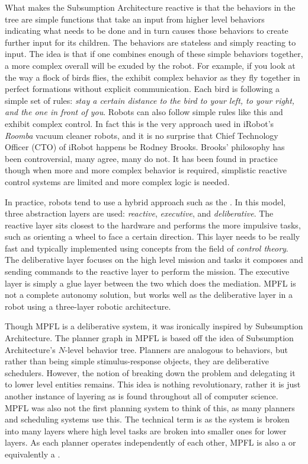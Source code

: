 What makes the Subsumption Architecture reactive is that the behaviors in the tree are simple functions that take an input from higher level behaviors indicating what needs to be done and in turn causes those behaviors to create further input for its children. The behaviors are stateless and simply reacting to input. The idea is that if one combines enough of these simple behaviors together, a more complex overall  will be exuded by the robot. For example, if you look at the way a flock of birds flies, the exhibit complex behavior as they fly together in perfect formations without explicit communication. Each bird is following a simple set of rules: \textit{stay a certain distance to the bird to your left, to your right, and the one in front of you}. Robots can also follow simple rules like this and exhibit complex control. In fact this is the very approach used in iRobot's \textit{Roomba} vacuum cleaner robots, and it is no surprise that Chief Technology Officer (CTO) of iRobot happens be Rodney Brooks. Brooks' philosophy has been controversial, many agree, many do not. It has been found in practice though when more and more complex behavior is required, simplistic reactive control systems are limited and more complex logic is needed.

In practice, robots tend to use a hybrid approach such as the . In this model, three abstraction layers are used: \textit{reactive}, \textit{executive}, and \textit{deliberative}. The reactive layer sits closest to the hardware and performs the more impulsive tasks, such as orienting a wheel to face a certain direction. This layer needs to be really fast and typically implemented using concepts from the field of \textit{control theory}. The deliberative layer focuses on the high level mission and tasks it composes and sending commands to the reactive layer to perform the mission. The executive layer is simply a glue layer between the two which does the mediation. MPFL is not a complete autonomy solution, but works well as the deliberative layer in a robot using a three-layer robotic architecture.

Though MPFL is a deliberative system, it was ironically inspired by Subsumption Architecture. The planner graph in MPFL is based off the idea of Subsumption Architecture's $N$-level behavior tree. Planners are analogous to behaviors, but rather than being simple stimulus-response objects, they are deliberative schedulers. However, the notion of breaking down the problem and delegating it to lower level entities remains. This idea is nothing revolutionary, rather it is just another instance of layering as is found throughout all of computer science. MPFL was also not the first planning system to think of this, as many planners and scheduling systems use this. The technical term is  as the system is broken into many layers where high level tasks are broken into smaller ones for lower layers. As each planner operates independently of each other, MPFL is also a  or equivalently a .
 
